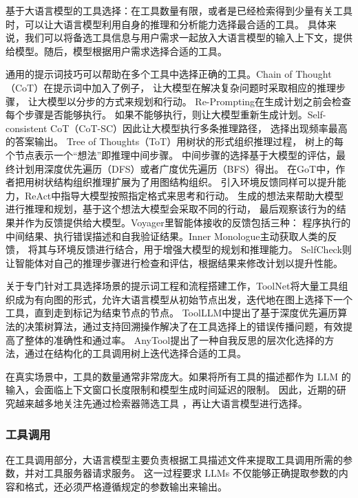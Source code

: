基于大语言模型的工具选择：在工具数量有限，或者是已经检索得到少量有关工具时，可以让大语言模型利用自身的推理和分析能力选择最合适的工具。
具体来说，我们可以将备选工具信息与用户需求一起放入大语言模型的输入上下文，提供给模型。随后，模型根据用户需求选择合适的工具。

通用的提示词技巧可以帮助在多个工具中选择正确的工具。Chain of Thought（CoT）\cite{Wang2023a}在提示词中加入了例子，
让大模型在解决复杂问题时采取相应的推理步骤，
让大模型以分步的方式来规划和行动。
Re-Prompting\cite{Raman2022}在生成计划之前会检查每个步骤是否能够执行。
如果不能够执行，则让大模型重新生成计划。Self-consistent CoT（CoT-SC）\cite{wang2022self}因此让大模型执行多条推理路径，
选择出现频率最高的答案输出。
Tree of Thoughts（ToT）\cite{Yao2023a}用树状的形式组织推理过程，
树上的每个节点表示一个“想法”即推理中间步骤。
中间步骤的选择基于大模型的评估，最终计划用深度优先遍历（DFS）或者广度优先遍历（BFS）得出。
在GoT\cite{Besta2023}中，作者把用树状结构组织推理扩展为了用图结构组织。
引入环境反馈同样可以提升能力，ReAct\cite{Yao2023b}中指导大模型按照指定格式来思考和行动。
生成的想法来帮助大模型进行推理和规划，基于这个想法大模型会采取不同的行动，
最后观察该行为的结果并作为反馈提供给大模型。Voyager\cite{Wang2023b}里智能体接收的反馈包括三种：
程序执行的中间结果、执行错误描述和自我验证结果。Inner Monologue\cite{Huang2022}主动获取人类的反馈，
将其与环境反馈进行结合，用于增强大模型的规划和推理能力。
SelfCheck\cite{Miao2023}则让智能体对自己的推理步骤进行检查和评估，根据结果来修改计划以提升性能。

关于专门针对工具选择场景的提示词工程和流程搭建工作，ToolNet\cite{Liu2024}将大量工具组织成为有向图的形式，允许大语言模型从初始节点出发，迭代地在图上选择下一个工具，直到走到标记为结束节点的节点。
ToolLLM\cite{Qin2023}中提出了基于深度优先遍历算法的决策树算法，通过支持回溯操作解决了在工具选择上的错误传播问题，有效提高了整体的准确性和通过率。
AnyTool\cite{Du2024}提出了一种自我反思的层次化选择的方法，通过在结构化的工具调用树上迭代选择合适的工具。

在真实场景中，工具的数量通常非常庞大。如果将所有工具的描述都作为 LLM 的输入，会面临上下文窗口长度限制和模型生成时间延迟的限制。
因此，近期的研究越来越多地关注先通过检索器筛选工具\cite{Qin2023, anantha2023protip, Liu2024} ，再让大语言模型进行选择。

\subsubsection{工具调用}

在工具调用部分，大语言模型主要负责根据工具描述文件来提取工具调用所需的参数，并对工具服务器请求服务。
这一过程要求 LLMs 不仅能够正确提取参数的内容和格式，还必须严格遵循规定的参数输出来输出。

